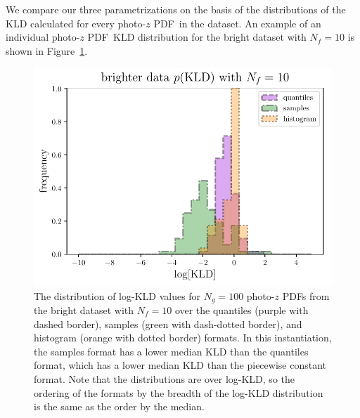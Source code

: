 \documentclass[\docopts]{\docclass}
\newcommand{\pz}{photo-$z$ PDF}
\newcommand{\mgdata}{bright\xspace}
\begin{document}
We compare our three parametrizations on the basis of the distributions of the 
KLD calculated for every \pz\ in the dataset.
An example of an individual \pz\ KLD distribution for the \mgdata dataset with 
$N_{f}=10$ is shown in Figure~\ref{fig:individual}.
\begin{figure}
  \begin{center}
    \includegraphics[width=\columnwidth]{figures/individual_kld.pdf}
    \caption{The distribution of log-KLD values for $N_{g}=100$ \pz s from the 
\mgdata dataset with $N_{f}=10$ over the quantiles (purple with dashed border), 
samples (green with dash-dotted border), and histogram (orange with dotted 
border) formats.
    In this instantiation, the samples format has a lower median KLD than the 
quantiles format, which has a lower median KLD than the piecewise constant 
format.
    Note that the distributions are over log-KLD, so the ordering of the 
formats by the breadth of the log-KLD distribution is the same as the order by 
the median.
    \label{fig:individual}}
  \end{center}
\end{figure}
\end{document}

